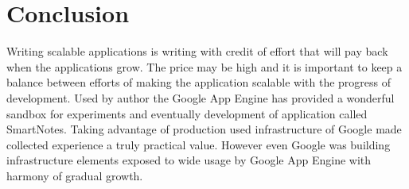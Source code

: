 \chapter{Conclusion}
Writing scalable applications is writing with credit of effort that will pay back when the applications grow. The price may be high and it is important to keep a balance between efforts of making the application scalable with the progress of development. Used by author  the Google App Engine has provided a wonderful sandbox for experiments and eventually development of application called SmartNotes. Taking advantage of production used infrastructure of Google made collected experience a truly practical value. However even Google was building infrastructure elements exposed to wide usage by Google App Engine  with harmony of gradual growth.

